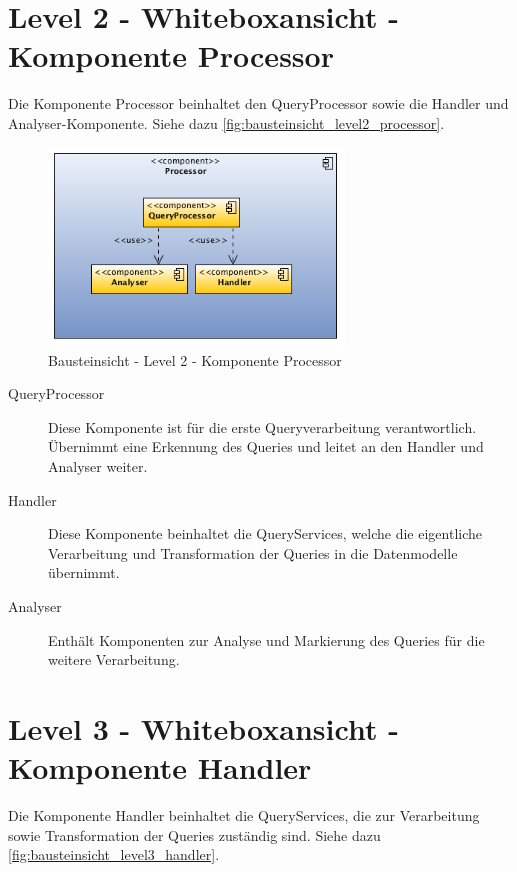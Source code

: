 \section{Level 2 - Whiteboxansicht - Komponente Processor}

Die Komponente Processor beinhaltet den QueryProcessor sowie die Handler und Analyser-Komponente. Siehe dazu \autoref{fig:bausteinsicht_level2_processor}. 

\begin{figure}[htbp]
	\centering
		\includegraphics[width=0.70\textwidth]{images/bausteinsicht_plib_level2_processor.png}
	\caption{Bausteinsicht - Level 2 - Komponente Processor}
	\label{fig:bausteinsicht_level2_processor}
\end{figure}

\begin{description}
\item[QueryProcessor] Diese Komponente ist für die erste Queryverarbeitung verantwortlich. Übernimmt eine Erkennung des Queries und leitet an den Handler und Analyser weiter. 
\item[Handler] Diese Komponente beinhaltet die QueryServices, welche die eigentliche Verarbeitung und Transformation der Queries in die Datenmodelle übernimmt.
\item[Analyser] Enthält Komponenten zur Analyse und Markierung des Queries für die weitere Verarbeitung. 
\end{description}

\section{Level 3 - Whiteboxansicht - Komponente Handler}

Die Komponente Handler beinhaltet die QueryServices, die zur Verarbeitung sowie Transformation der Queries zuständig sind. Siehe dazu \autoref{fig:bausteinsicht_level3_handler}. 

